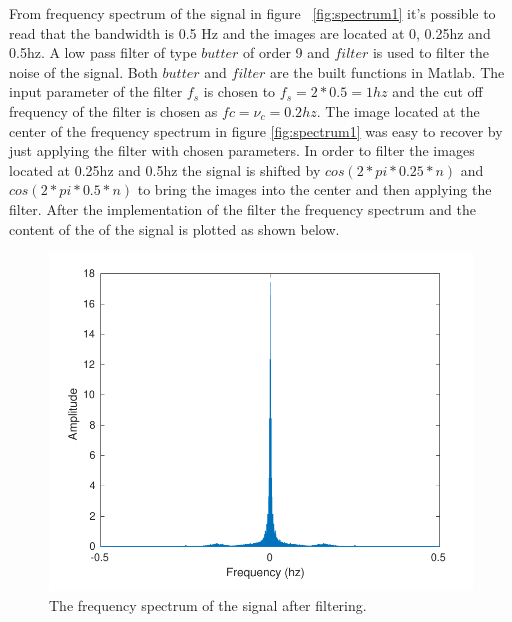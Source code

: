 \documentclass[a4paper,twocolumn]{article}
\begin{document}
\noindent
From frequency spectrum of the signal in figure ~\ref{fig:spectrum1} it's possible to read that the bandwidth is 0.5 Hz and the images are located at 0, 0.25hz and 0.5hz. A low pass filter of type $butter$ of order 9 and $filter$ is used to 
filter the noise of the signal. Both $butter$ and $filter$ are the built functions in Matlab. The input parameter of the filter $f_s$ is chosen to $f_s = 2 * 0.5 = 1 hz$ and the cut off frequency of the filter is chosen as $fc = \nu_c = 0.2 hz$. The image located at the center of the frequency spectrum in figure \ref{fig:spectrum1} was easy to recover by just applying the filter with chosen parameters. In order to filter the images located at 0.25hz and 0.5hz the signal is shifted by $cos(2*pi*0.25*n)$ and $cos(2*pi*0.5*n)$ to bring the images into the center and then applying the filter.
After the implementation of the filter the frequency spectrum and the content of the of the signal is plotted as shown below.

\begin{figure}[H]
  \begin{center}
    \includegraphics[width=0.9\columnwidth]{freq2corped.pdf}
  \end{center}
  \caption{The frequency spectrum of the signal after filtering.}
  \label{fig:spectrum2}
\end{figure}
\end{document}

